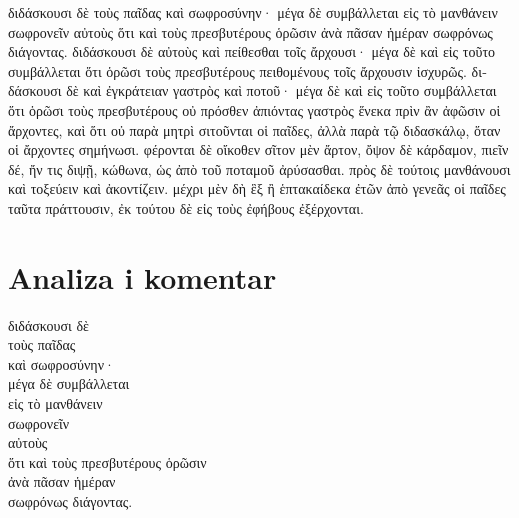
\medskip


{\large

\begin{greek}

\noindent  διδάσκουσι δὲ τοὺς παῖδας καὶ σωφροσύνην· μέγα δὲ συμβάλλεται εἰς τὸ μανθάνειν σωφρονεῖν αὐτοὺς ὅτι καὶ τοὺς πρεσβυτέρους ὁρῶσιν ἀνὰ πᾶσαν ἡμέραν σωφρόνως διάγοντας. διδάσκουσι δὲ αὐτοὺς καὶ πείθεσθαι τοῖς ἄρχουσι· μέγα δὲ καὶ εἰς τοῦτο συμβάλλεται ὅτι ὁρῶσι τοὺς πρεσβυτέρους πειθομένους τοῖς ἄρχουσιν ἰσχυρῶς. διδάσκουσι δὲ καὶ ἐγκράτειαν γαστρὸς καὶ ποτοῦ· μέγα δὲ καὶ εἰς τοῦτο συμβάλλεται ὅτι ὁρῶσι τοὺς πρεσβυτέρους οὐ πρόσθεν ἀπιόντας γαστρὸς ἕνεκα πρὶν ἂν ἀφῶσιν οἱ ἄρχοντες, καὶ ὅτι οὐ παρὰ μητρὶ σιτοῦνται οἱ παῖδες, ἀλλὰ παρὰ τῷ διδασκάλῳ, ὅταν οἱ ἄρχοντες σημήνωσι. φέρονται δὲ οἴκοθεν σῖτον μὲν ἄρτον, ὄψον δὲ κάρδαμον, πιεῖν δέ, ἤν τις διψῇ, κώθωνα, ὡς ἀπὸ τοῦ ποταμοῦ ἀρύσασθαι. πρὸς δὲ τούτοις μανθάνουσι καὶ τοξεύειν καὶ ἀκοντίζειν. μέχρι μὲν δὴ ἓξ ἢ ἑπτακαίδεκα ἐτῶν ἀπὸ γενεᾶς οἱ παῖδες ταῦτα πράττουσιν, ἐκ τούτου δὲ εἰς τοὺς ἐφήβους ἐξέρχονται.

\end{greek}

}


\section*{Analiza i komentar}



{\large
\begin{greek}
\noindent  διδάσκουσι δὲ \\
τοὺς παῖδας \\
καὶ σωφροσύνην· \\
μέγα δὲ συμβάλλεται \\
\tabto{2em} εἰς τὸ μανθάνειν \\
\tabto{4em} σωφρονεῖν \\
\tabto{2em} αὐτοὺς \\

ὅτι καὶ τοὺς πρεσβυτέρους ὁρῶσιν \\
\tabto{4em} ἀνὰ πᾶσαν ἡμέραν \\
\tabto{2em} σωφρόνως διάγοντας. \\

\end{greek}
}

